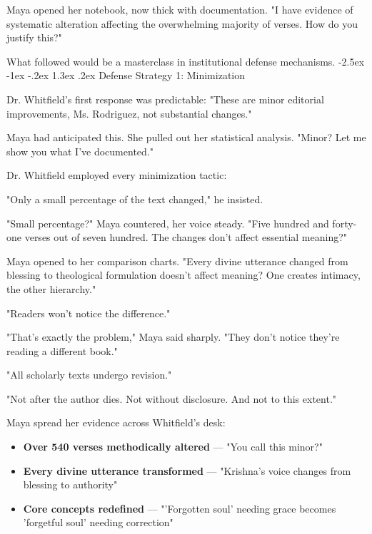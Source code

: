 \documentclass[12pt,twoside]{book}
\makeatletter
\renewcommand\section{\@startsection{section}{1}{\z@}%
{-2.5ex \@plus -1ex \@minus -.2ex}%
{1.3ex \@plus.2ex}%
{\normalfont\Large\bfseries}}
\makeatother
\begin{document}
Maya opened her notebook, now thick with documentation. "I have evidence of systematic alteration affecting the overwhelming majority of verses. How do you justify this?"

What followed would be a masterclass in institutional defense mechanisms.
\section{Defense Strategy 1: Minimization}
\label{sec:org405929c}

Dr. Whitfield's first response was predictable: "These are minor editorial improvements, Ms. Rodriguez, not substantial changes."

Maya had anticipated this. She pulled out her statistical analysis. "Minor? Let me show you what I've documented."

Dr. Whitfield employed every minimization tactic:

"Only a small percentage of the text changed," he insisted.

"Small percentage?" Maya countered, her voice steady. "Five hundred and forty-one verses out of seven hundred. The changes don't affect essential meaning?"

Maya opened to her comparison charts. "Every divine utterance changed from blessing to theological formulation doesn't affect meaning? One creates intimacy, the other hierarchy."

"Readers won't notice the difference."

"That's exactly the problem," Maya said sharply. "They don't notice they're reading a different book."

"All scholarly texts undergo revision."

"Not after the author dies. Not without disclosure. And not to this extent."

Maya spread her evidence across Whitfield's desk:

\begin{itemize}
\item \textbf{\textbf{Over 540 verses methodically altered}} — "You call this minor?"
\item \textbf{\textbf{Every divine utterance transformed}} — "Krishna's voice changes from blessing to authority"
\item \textbf{\textbf{Core concepts redefined}} — "'Forgotten soul' needing grace becomes 'forgetful soul' needing correction"
\end{itemize}
\end{document}
